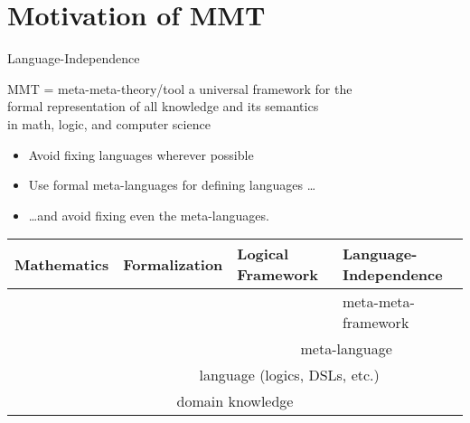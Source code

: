 \documentclass{beamer}
\begin{document}
\section{Motivation of MMT}

\begin{myframe}{Language-Independence}
\begin{block}{MMT = meta-meta-theory/tool}
\centering
a universal framework for the \\ formal representation of all knowledge and its semantics \\ in math, logic, and computer science
\end{block}

\begin{itemize}
	\item Avoid fixing languages wherever possible 
	\item Use formal meta-languages for defining languages \ldots
	\item \ldots and avoid fixing even the meta-languages. 
\end{itemize}

\begin{center}
\begin{tabular}{|p{2cm}|p{2cm}|p{2cm}|p{2cm}|}
\hline
Mathematics      & Formalization            & Logical Framework    & Language-Independence \\
\hline
\hline
\multicolumn{3}{|c|}{} & meta-meta-framework\\\cline{3-4}
\multicolumn{2}{|c|}{} & \multicolumn{2}{c|}{meta-language}\\\cline{2-4}
                      & \multicolumn{3}{c|}{language (logics, DSLs, etc.)}\\\hline
\multicolumn{4}{|c|}{domain knowledge} \\
\hline
\end{tabular}
\end{center}
\end{myframe}
\end{document}

